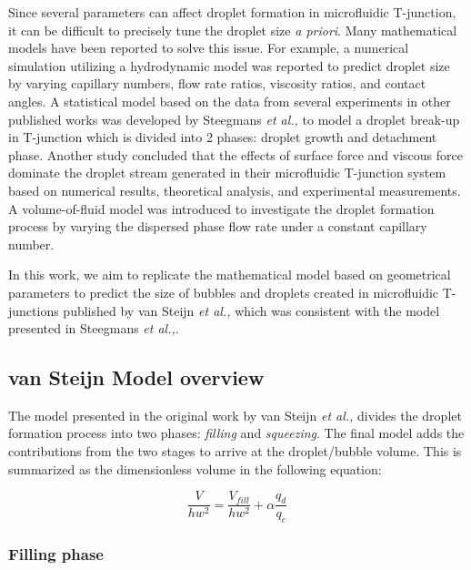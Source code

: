 Since several parameters can affect droplet formation in microfluidic T-junction, it
can be difficult to precisely tune the droplet size \emph{a priori}. Many mathematical models
have been reported to solve this issue. For example, a numerical simulation utilizing a
hydrodynamic model was reported to predict droplet size by varying capillary numbers,
flow rate ratios, viscosity ratios, and contact angles\supercite{liu_droplet_2009}.
A statistical model based on the data from several experiments in other published
works was developed by Steegmans \emph{et al.,} to model a droplet break-up in T-junction which is divided into
2 phases: droplet growth and detachment phase\supercite{steegmans_generalised_2009}.
Another study concluded that the effects of surface force and viscous force dominate
the droplet stream generated in their microfluidic T-junction system based on numerical
results, theoretical analysis, and experimental measurements\supercite{li_study_2012}.
A volume-of-fluid model was introduced to investigate the droplet formation process
by varying the dispersed phase flow rate under a constant capillary
number\supercite{soh_numerical_2016}. 

In this work, we aim to replicate the mathematical model based on
geometrical parameters to predict the size of bubbles and droplets created in
microfluidic T-junctions published by van Steijn \emph{et al.,}\supercite{van_steijn_predictive_2010}
which was consistent with the model presented in Steegmans \emph{et al.,}.

\subsection{van Steijn Model overview}

The model presented in the original work by van Steijn \emph{et al.,}\supercite{van_steijn_predictive_2010}
divides the droplet formation process into two phases: \emph{filling} and \emph{squeezing}. The final model
adds the contributions from the two stages to arrive at the droplet/bubble volume.
This is summarized as the dimensionless volume in the following equation:

\begin{equation}
  \frac{V}{hw^2} = \frac{V_{fill}}{hw^{2}}+\alpha\frac{q_{d}}{q_{c}}
\end{equation}

\subsubsection{Filling phase}


